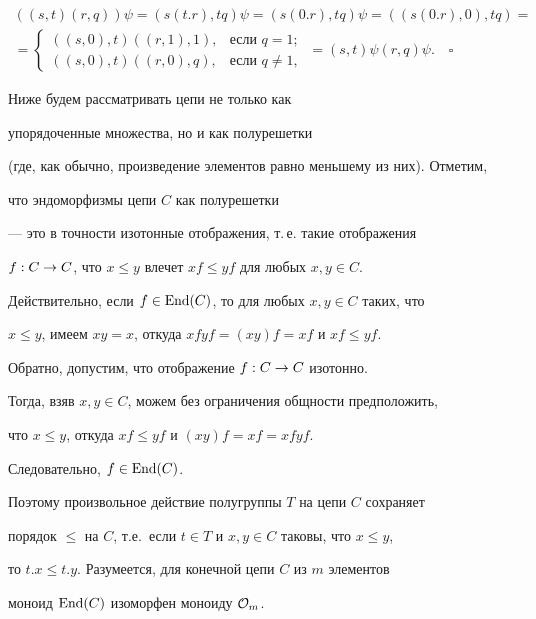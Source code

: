 \begin{multline*}


((s,t)(r,q))\psi=(s(t.r),tq)\psi=(s(0.r),tq)\psi


=((s(0.r),0),tq)= \\


=


\begin{cases}


((s,0),t)((r,1),1), &\text{если } q=1;\\


((s,0),t)((r,0),q), &\text{если } q\neq1,


\end{cases}


\ =(s,t)\psi(r,q)\psi.\quad\square


\end{multline*}


\medskip





Ниже будем рассматривать цепи не только как


упорядоченные множества, но и как полурешетки


(где, как обычно, произведение элементов равно меньшему из них). Отметим,


что эндоморфизмы цепи $C$ как полурешетки


--- это в точности изотонные отображения, т.\,е. такие отображения


$f:C\rightarrow C$, что $x\le y$ влечет $xf\le yf$ для любых $x,y\in C$.


Действительно, если $f\in\operatorname{End}(C)$, то для любых $x,y\in C$ таких, что


$x\le y$, имеем $xy=x$, откуда $xfyf=(xy)f=xf$ и $xf\le yf$.


Обратно, допустим, что отображение $f:C\rightarrow C$ изотонно.


Тогда, взяв $x,y\in C$, можем без ограничения общности предположить,


что $x\le y$, откуда $xf\le yf$ и $(xy)f=xf=xfyf$.


Следовательно, $f\in\operatorname{End}(C)$.


Поэтому произвольное действие полугруппы $T$ на цепи $C$ сохраняет


порядок $\le $ на $C$, т.е.\ если $t\in T$ и $x,y\in C$ таковы, что $x\le y$,


то $t.x\le t.y$. Разумеется, для конечной цепи $C$ из $m$ элементов


моноид $\operatorname{End}(C)$ изоморфен моноиду ${\cal O}_m$.





